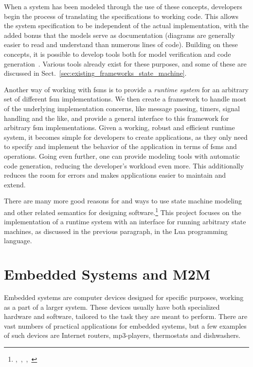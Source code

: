 When a system has been modeled through the use of these concepts, developers begin the process of translating the specifications to working code. This allows the system specification to be independent of the actual implementation, with the added bonus that the models serve as documentation (diagrams are generally easier to read and understand than numerous lines of code). Building on these concepts, it is possible to develop tools both for model verification and code generation~\cite{article:compositional_arctis}. Various tools already exist for these purposes, and some of these are discussed in Sect.~\ref{sec:existing_frameworks_state_machine}.

Another way of working with \glspl{fsm} is to provide a \emph{runtime system} for an arbitrary set of different \gls{fsm} implementations. We then create a framework to handle most of the underlying implementation concerns, like message passing, timers, signal handling and the like, and provide a general interface to this framework for arbitrary \gls{fsm} implementations. Given a working, robust and efficient runtime system, it becomes simple for developers to create applications, as they only need to specify and implement the behavior of the application in terms of \glspl{fsm} and operations. Going even further, one can provide modeling tools with automatic code generation, reducing the developer's workload even more. This additionally reduces the room for errors and makes applications easier to maintain and extend.

There are many more good reasons for and ways to use state machine modeling and other related semantics for designing software.\footnote{\cite{article:itut_methodologies},~\cite{chapter:structural_modeling_uml},~\cite{conference:system_analysis_modeling},~\cite{phd:frank}} This project focuses on the implementation of a runtime system with an interface for running arbitrary state machines, as discussed in the previous paragraph, in the Lua programming language.

\section{Embedded Systems and M2M}
\label{sec:embedded_m2m}
Embedded systems are computer devices designed for specific purposes, working as a part of a larger system. These devices usually have both specialized hardware and software, tailored to the task they are meant to perform. There are vast numbers of practical applications for embedded systems, but a few examples of such devices are Internet routers, mp3-players, thermostats and dishwashers.

